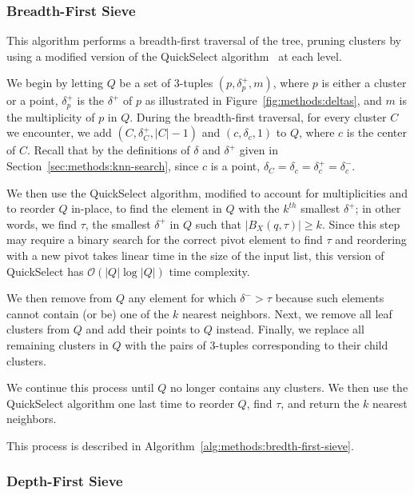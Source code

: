 \subsubsection{Breadth-First Sieve}
\label{sec:methods:knn-search:bredth-first-sieve}

This algorithm performs a breadth-first traversal of the tree, pruning clusters by using a modified version of the QuickSelect algorithm~\cite{hoare1961algorithm} at each level.

We begin by letting $Q$ be a set of 3-tuples $(p, \delta^{+}_{p}, m)$, where $p$ is either a cluster or a point, $\delta^{+}_{p}$ is the $\delta^{+}$ of $p$ as illustrated in Figure~\ref{fig:methods:deltas}, and $m$ is the multiplicity of $p$ in $Q$.
During the breadth-first traversal, for every cluster $C$ we encounter, we add $(C, \delta^{+}_{C}, |C| - 1)$ and $(c, \delta_{c}, 1)$ to $Q$, where $c$ is the center of $C$.
Recall that by the definitions of $\delta$ and $\delta^{+}$ given in Section~\ref{sec:methods:knn-search}, since $c$ is a point, $\delta_{C} = \delta_{c} = \delta^{+}_{c} = \delta^{-}_{c}$.

We then use the QuickSelect algorithm, modified to account for multiplicities and to reorder $Q$ in-place, to find the element in $Q$ with the $k^{th}$ smallest $\delta^{+}$; in other words, we find $\tau$, the smallest $\delta^{+}$ in $Q$ such that $\left| B_X(q, \tau) \right| \geq k$.
Since this step may require a binary search for the correct pivot element to find $\tau$ and reordering with a new pivot takes linear time in the size of the input list, this version of QuickSelect has $\mathcal{O}(|Q| \log |Q|)$ time complexity.

We then remove from $Q$ any element for which $\delta^{-} > \tau$ because such elements cannot contain (or be) one of the $k$ nearest neighbors.
Next, we remove all leaf clusters from $Q$ and add their points to $Q$ instead.
Finally, we replace all remaining clusters in $Q$ with the pairs of 3-tuples corresponding to their child clusters.

We continue this process until $Q$ no longer contains any clusters.
We then use the QuickSelect algorithm one last time to reorder $Q$, find $\tau$, and return the $k$ nearest neighbors.

This process is described in Algorithm~\ref{alg:methods:bredth-first-sieve}.

\subsubsection{Depth-First Sieve}
\label{sec:methods:knn-search:depth-first-sieve}

